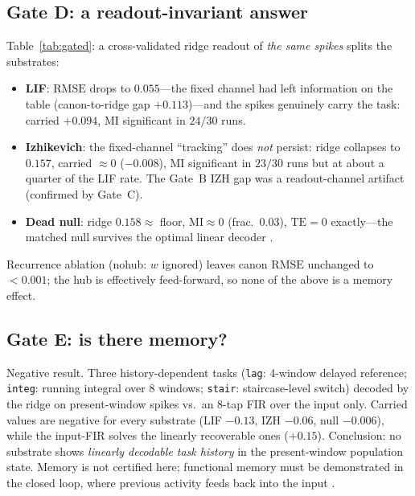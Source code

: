\documentclass[10pt,a4paper]{article}
\newcommand{\RMSE}{\ensuremath{\mathrm{RMSE}}}
\newcommand{\MI}{\ensuremath{\mathrm{MI}}}
\newcommand{\TE}{\ensuremath{\mathrm{TE}}}
\begin{document}
\subsection{Gate D: a readout-invariant answer}\label{sec:gatedres}
\begin{table}[H]
\centering
\caption{Gate D: same spikes, decoder sweep (pooled 5 profiles
$\times$ 6 seeds). ``carried'' $=$ $\RMSE_{\mathrm{meanpd}}-
\RMSE_{\mathrm{ridge}}$; $\MI_{\mathrm{sig}}$ is the fraction of runs
with significant $\MI$.}
\label{tab:gated}

\end{table}
Table~\ref{tab:gated}: a cross-validated ridge readout of
\emph{the same spikes} splits the substrates:
\begin{itemize}[nosep]
\item \textbf{LIF}: $\RMSE$ drops to $0.055$---the fixed channel had
left information on the table (canon-to-ridge gap $+0.113$)---and the
spikes genuinely carry the task: carried $+0.094$, $\MI$ significant in
$24/30$ runs.
\item \textbf{Izhikevich}: the fixed-channel ``tracking'' does
\emph{not} persist: ridge collapses to $0.157$, carried $\approx0$
($-0.008$), $\MI$ significant in $23/30$ runs but at about a quarter
of the LIF rate. The Gate~B IZH gap was a readout-channel artifact
(confirmed by Gate~C).
\item \textbf{Dead null}: ridge $0.158\approx$ floor, $\MI\approx0$
(frac.\ $0.03$), $\TE=0$ exactly---the matched null survives the
optimal linear decoder \cite{hoerl1970,paninski2004}.
\end{itemize}
Recurrence ablation (nohub: $w$ ignored) leaves canon $\RMSE$ unchanged
to $<0.001$; the hub is effectively feed-forward, so none of the above
is a memory effect.

\subsection{Gate E: is there memory?}\label{sec:gateeres}
\begin{table}[H]
\centering
\caption{Gate E: carried info (best linear readout minus floor) per
profile, plus the input-only 8-tap FIR reference.}
\label{tab:gatee}

\end{table}
Negative result. Three history-dependent tasks (\texttt{lag}:
4-window delayed reference; \texttt{integ}: running integral over
$8$ windows; \texttt{stair}: staircase-level switch) decoded by the
ridge on present-window spikes vs.\ an $8$-tap FIR over the input only.
Carried values are negative for every substrate
(LIF $-0.13$, IZH $-0.06$, null $-0.006$), while the input-FIR solves
the linearly recoverable ones ($+0.15$). Conclusion: no substrate shows
\emph{linearly decodable task history} in the present-window population
state. Memory is not certified here; functional memory must be
demonstrated in the closed loop, where previous activity feeds back
into the input \cite{carmena2003,nicolelis2003}.
\end{document}
